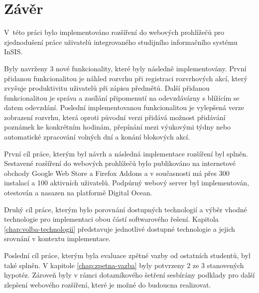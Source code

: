 \chapter*{Závěr}

V~této práci bylo implementováno rozšíření do webových prohlížečů pro zjednodušení práce uživatelů integrovaného studijního informačního systému InSIS.

Byly navrženy 3 nové funkcionality, které byly následně implementovány. První přidanou funkcionalitou je náhled rozvrhu při registraci rozvrhových akcí, který zvyšuje produktivitu uživatelů při zápisu předmětů. Další přidanou funkcionalitou je správa a zasílání připomenutí na odevzdávárny s blížícím se datem odevzdání. Poslední implementovanou funkcionalitou je vylepšená verze zobrazení rozvrhu, která oproti původní verzi přidává možnost přidávání poznámek ke konkrétním hodinám, přepínání mezi výukovými týdny nebo automatické zpracování volných dní a konání blokových akcí.

První cíl práce, kterým byl návrh a následná implementace rozšíření byl splněn. Sestavené rozšíření do webových prohlížečů bylo publikováno na internetové obchody Google Web Store a Firefox Addons a v současnosti má přes 300 instalací a 100 aktivních uživatelů. Podpůrný webový server byl implementován, otestován a nasazen na platformě Digital Ocean.

Druhý cíl práce, kterým bylo porovnání dostupných technologií a výběr vhodné technologie pro implementaci obou částí softwarového řešení. Kapitola \ref{chap:volba-technologii} představuje jednotlivé dostupné technologie a jejich srovnání v kontextu implementace. 

Poslední cíl práce, kterým byla evaluace zpětné vazby od ostatních studentů, byl také splněn. V kapitole 
\ref{chap:zpetna-vazba} byly potvrzeny 2 ze 3 stanovených hypotéz. Zároveň byly v rámci dotazníkového šetření sesbírány podklady pro další zlepšení webového rozšíření, které je možné do budoucna realizovat.